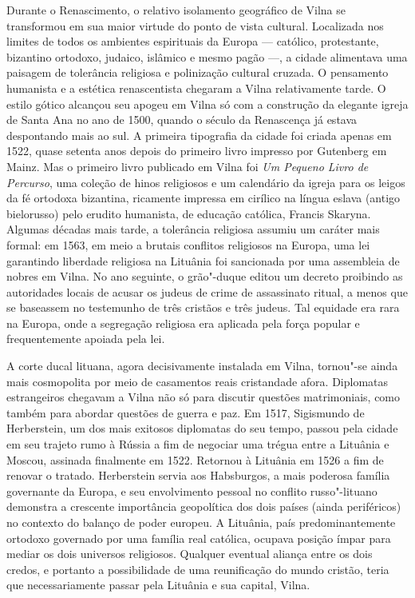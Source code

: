 Durante o Renascimento, o relativo isolamento geográfico de Vilna se
transformou em sua maior virtude do ponto de vista cultural. Localizada
nos limites de todos os ambientes espirituais da Europa --- católico,
protestante, bizantino ortodoxo, judaico, islâmico e mesmo pagão ---, a
cidade alimentava uma paisagem de tolerância religiosa e polinização
cultural cruzada. O pensamento humanista e a estética renascentista
chegaram a Vilna relativamente tarde. O estilo gótico alcançou seu
apogeu em Vilna só com a construção da elegante igreja de Santa Ana no
ano de 1500, quando o século da Renascença já estava despontando mais ao
sul. A primeira tipografia da cidade foi criada apenas em 1522, quase
setenta anos depois do primeiro livro impresso por Gutenberg em Mainz.
Mas o primeiro livro publicado em Vilna foi \textit{Um Pequeno Livro de
Percurso}, uma coleção de hinos religiosos e um calendário da igreja
para os leigos da fé ortodoxa bizantina, ricamente impressa em cirílico
na língua eslava (antigo bielorusso) pelo erudito humanista, de educação
católica, Francis Skaryna. Algumas décadas mais tarde, a tolerância
religiosa assumiu um caráter mais formal: em 1563, em meio a brutais
conflitos religiosos na Europa, uma lei garantindo liberdade religiosa
na Lituânia foi sancionada por uma assembleia de nobres em Vilna. No ano
seguinte, o grão"-duque editou um decreto proibindo as autoridades locais
de acusar os judeus de crime de assassinato ritual, a menos que se
baseassem no testemunho de três cristãos e três judeus. Tal equidade era
rara na Europa, onde a segregação religiosa era aplicada pela força
popular e frequentemente apoiada pela lei.

A corte ducal lituana, agora decisivamente instalada em Vilna, tornou"-se
ainda mais cosmopolita por meio de casamentos reais cristandade afora.
Diplomatas estrangeiros chegavam a Vilna não só para discutir questões
matrimoniais, como também para abordar questões de guerra e paz. Em
1517, Sigismundo de Herberstein, um dos mais exitosos diplomatas do seu
tempo, passou pela cidade em seu trajeto rumo à Rússia a fim de negociar
uma trégua entre a Lituânia e Moscou, assinada finalmente em 1522.
Retornou à Lituânia em 1526 a fim de renovar o tratado. Herberstein
servia aos Habsburgos, a mais poderosa família governante da Europa, e
seu envolvimento pessoal no conflito russo"-lituano demonstra a crescente
importância geopolítica dos dois países (ainda periféricos) no contexto
do balanço de poder europeu. A Lituânia, país predominantemente ortodoxo
governado por uma família real católica, ocupava posição ímpar para
mediar os dois universos religiosos. Qualquer eventual aliança entre os
dois credos, e portanto a possibilidade de uma reunificação do mundo
cristão, teria que necessariamente passar pela Lituânia e sua capital,
Vilna.

